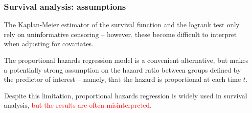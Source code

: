 \documentclass[12pt, 
hyperref={colorlinks=true, linkcolor=blue, urlcolor=cyan},dvipsnames]{beamer}
\begin{document}
\begin{frame}
\frametitle{Survival analysis: assumptions}

The Kaplan-Meier estimator of the survival function and the logrank test only rely on uninformative censoring -- however, these become difficult to interpret when adjusting for covariates.

The proportional hazards regression model is a convenient alternative, but makes a potentially strong assumption on the hazard ratio between groups defined by the predictor of interest -- namely, that the hazard is proportional at each time $t$.

Despite this limitation, proportional hazards regression is widely used in survival analysis, \textcolor{red}{but the results are often misinterpreted}.
\end{frame}
\end{document}
